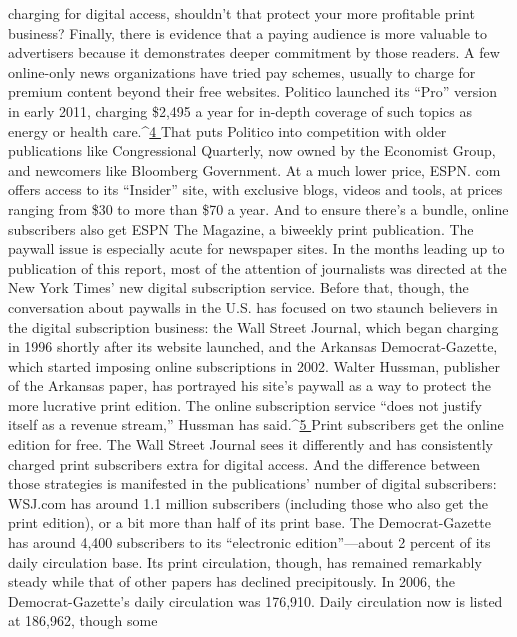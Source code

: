 charging for digital access, shouldn’t that protect your more profitable print business?
Finally, there is evidence that a paying audience is more valuable to advertisers
because it demonstrates deeper commitment by those readers.
A few online-only news organizations have tried pay schemes, usually to
charge for premium content beyond their free websites. Politico launched its
``Pro'' version in early 2011, charging \$2,495 a year for in-depth coverage of such
topics as energy or health care.^{\href{#endnotes-ch5}{4 }}That puts Politico into competition with older
publications like Congressional Quarterly, now owned by the Economist Group,
and newcomers like Bloomberg Government. At a much lower price, ESPN.
com offers access to its ``Insider'' site, with exclusive blogs, videos and tools, at
prices ranging from \$30 to more than \$70 a year. And to ensure there’s a bundle,
online subscribers also get ESPN The Magazine, a biweekly print publication.
The paywall issue is especially acute for newspaper sites. In the months leading
up to publication of this report, most of the attention of journalists was directed
at the New York Times’ new digital subscription service. Before that, though, the
conversation about paywalls in the U.S. has focused on two staunch believers in
the digital subscription business: the Wall Street Journal, which began charging
in 1996 shortly after its website launched, and the Arkansas Democrat-Gazette,
which started imposing online subscriptions in 2002.
Walter Hussman, publisher of the Arkansas paper, has portrayed his site’s paywall
as a way to protect the more lucrative print edition. The online subscription
service ``does not justify itself as a revenue stream,'' Hussman has said.^{\href{#endnotes-ch5}{5 }}Print subscribers
get the online edition for free.
The Wall Street Journal sees it differently and has consistently charged print
subscribers extra for digital access. And the difference between those strategies
is manifested in the publications’ number of digital subscribers: WSJ.com has
around 1.1 million subscribers (including those who also get the print edition),
or a bit more than half of its print base. The Democrat-Gazette has around 4,400
subscribers to its ``electronic edition''—about 2 percent of its daily circulation
base. Its print circulation, though, has remained remarkably steady while that of
other papers has declined precipitously. In 2006, the Democrat-Gazette’s daily
circulation was 176,910. Daily circulation now is listed at 186,962, though some
